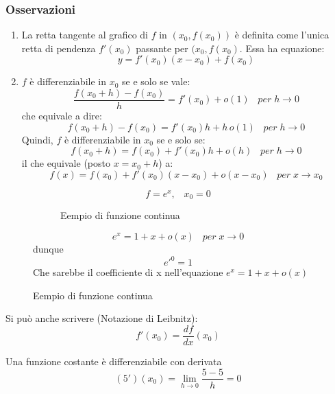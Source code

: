 \documentclass[a4paper]{article}
\theoremstyle{break}
\theoremstyle{break}
\theoremstyle{break}
\theoremstyle{break}
\begin{document}
\subsubsection{Osservazioni}
\begin{enumerate}
	\item La retta tangente al grafico di \( f \) in \( (x_0, f(x_0)) \) è definita
	      come l'unica retta di pendenza \( f'(x_0) \) passante per \( (x_0, f(x_0) \).
	      Essa ha equazione:
	      \[
		      y = f'(x_0)(x-x_0) + f(x_0)
	      \]
	\item \( f \) è differenziabile in \( x_0 \) se e solo se vale:
	      \[
		      \frac{f(x_0+h)-f(x_0)}{h}=f'(x_0) + o(1)\;\;\; per\;h \to 0
	      \]
	      che equivale a dire:
	      \[
		      f(x_0+h)-f(x_0)=f'(x_0)h+h\,o(1)\;\;\; per\;h \to 0
	      \]
	      Quindi, \( f \) è differenziabile in \( x_0 \) se e solo se:
	      \[
		      f(x_0+h)=f(x_0)+f'(x_0)h + o(h) \;\;\; per\;h \to 0
	      \]
	      il che equivale (posto \( x=x_0+h \)) a:
	      \[
		      f(x)=f(x_0)+f'(x_0)(x-x_0)+o(x-x_0)\;\;\; per\;x \to x_0
	      \]
\end{enumerate}
\begin{figure}[H]
	\begin{example}
		\[
			f=e^x,\;\;\; x_0=0
		\]
		\begin{figure}[H]
			\begin{center}
			\end{center}
			\caption{Eempio di funzione continua}
		\end{figure}
		\[
			e^x = 1 + x + o(x)\;\;\; per\;x \to 0
		\]
		dunque
		\[
			e'^0=1
		\]
		Che sarebbe il coefficiente di x nell'equazione \( e^x=1+x+o(x) \)
	\end{example}
\end{figure}
Si può anche scrivere (Notazione di Leibnitz):
\[
	f'(x_0) = \frac{df}{dx}(x_0)
\]
\begin{example}
	Una funzione costante è differenziabile con derivata
	\[
		(5')(x_0)= \lim_{h \to 0} \frac{5-5}{h} = 0
	\]
\end{example}
\end{document}
